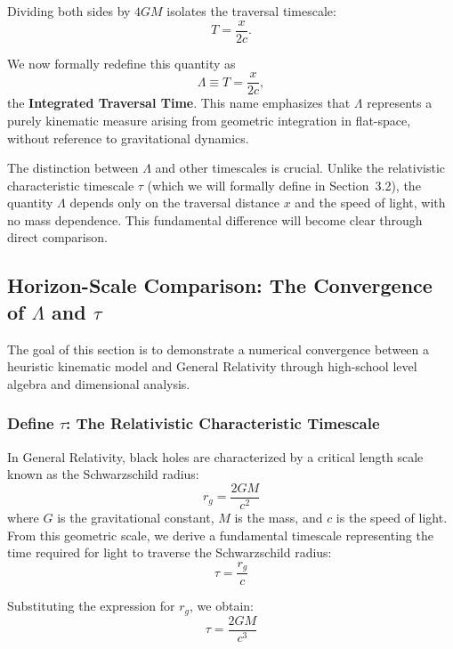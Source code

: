 \documentclass[12pt,a4paper]{article}
\begin{document}
Dividing both sides by $4GM$ isolates the traversal timescale:
\begin{equation}
    T = \frac{x}{2c}.
\end{equation}

We now formally redefine this quantity as
\begin{equation}
    \Lambda \equiv T = \frac{x}{2c},
\end{equation}
the \textbf{Integrated Traversal Time}. This name emphasizes that $\Lambda$ represents a purely kinematic measure arising from geometric integration in flat-space, without reference to gravitational dynamics. 

The distinction between $\Lambda$ and other timescales is crucial. Unlike the relativistic characteristic timescale $\tau$ (which we will formally define in Section~3.2), the quantity $\Lambda$ depends only on the traversal distance $x$ and the speed of light, with no mass dependence. This fundamental difference will become clear through direct comparison.

\subsection{Horizon-Scale Comparison: The Convergence of \texorpdfstring{$\Lambda$ and $\tau$}{Lambda and tau}}

The goal of this section is to demonstrate a numerical convergence between a heuristic kinematic model and General Relativity through high-school level algebra and dimensional analysis.

\subsubsection{Define \texorpdfstring{$\tau$}{tau}: The Relativistic Characteristic Timescale}

In General Relativity, black holes are characterized by a critical length scale known as the Schwarzschild radius:
\begin{equation}
    r_g = \frac{2GM}{c^2}
\end{equation}
where $G$ is the gravitational constant, $M$ is the mass, and $c$ is the speed of light. From this geometric scale, we derive a fundamental timescale representing the time required for light to traverse the Schwarzschild radius:
\begin{equation}
    \tau = \frac{r_g}{c}
\end{equation}

Substituting the expression for $r_g$, we obtain:
\begin{equation}
    \tau = \frac{2GM}{c^3}
\end{equation}
\end{document}
